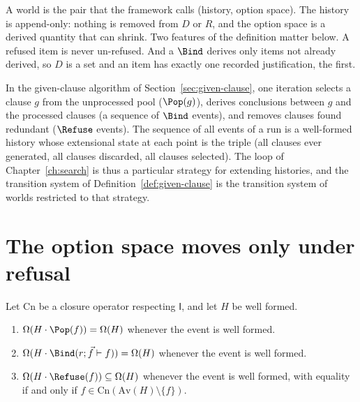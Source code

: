 A world is the pair that the framework calls (history, option space). The history is append-only: nothing is removed from $D$ or $R$, and the option space is a derived quantity that can shrink. Two features of the definition matter below. A refused item is never un-refused. And a $\Bind$ derives only items not already derived, so $D$ is a set and an item has exactly one recorded justification, the first.

\begin{example}
\label{ex:gcl-history}
In the given-clause algorithm of Section~\ref{sec:given-clause}, one iteration selects a clause $g$ from the unprocessed pool ($\Pop(g)$), derives conclusions between $g$ and the processed clauses (a sequence of $\Bind$ events), and removes clauses found redundant ($\Refuse$ events). The sequence of all events of a run is a well-formed history whose extensional state at each point is the triple (all clauses ever generated, all clauses discarded, all clauses selected). The loop of Chapter~\ref{ch:search} is thus a particular strategy for extending histories, and the transition system of Definition~\ref{def:given-clause} is the transition system of worlds restricted to that strategy.
\end{example}

\section{The option space moves only under refusal}

\begin{proposition}
\label{prop:dynamics}
Let $\mathrm{Cn}$ be a closure operator respecting $\mathsf I$, and let $H$ be well formed.
\begin{enumerate}[label=(\alph*),nosep]
\item $\Omega(H\cdot\Pop(f))=\Omega(H)$ whenever the event is well formed.
\item $\Omega(H\cdot\Bind(r;\vec f\vdash f))=\Omega(H)$ whenever the event is well formed.
\item $\Omega(H\cdot\Refuse(f))\subseteq\Omega(H)$ whenever the event is well formed, with equality if and only if $f\in\mathrm{Cn}(\mathrm{Av}(H)\setminus\{f\})$.
\end{enumerate}
\end{proposition}


